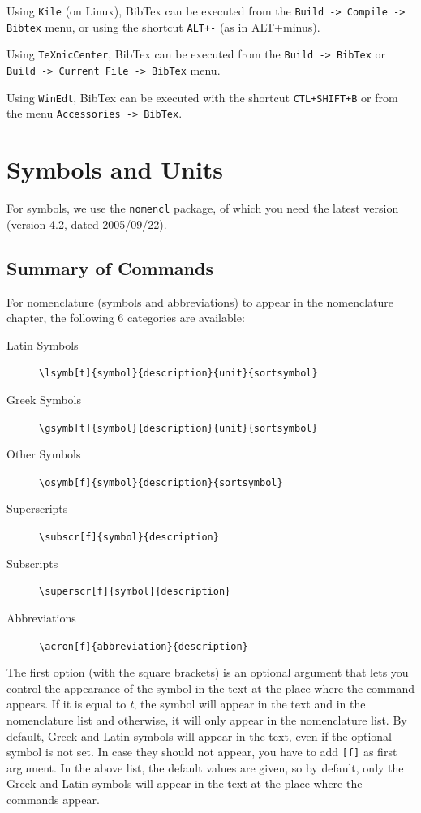         Using \verb+Kile+ (on Linux), BibTex can be executed from the \verb+Build -> Compile -> Bibtex+ menu, or using the shortcut \verb/ALT+-/ (as in ALT+minus).
        
        Using \verb+TeXnicCenter+, BibTex can be executed from the \verb+Build -> BibTex+ or \\
        \verb+Build -> Current File -> BibTex+ menu.
        
        Using \verb+WinEdt+, BibTex can be executed with the shortcut \verb/CTL+SHIFT+B/ or from the menu \verb/Accessories -> BibTex/.
    \section{Symbols and Units}%
        For symbols, we use the \verb+nomencl+ package, of which you need the latest version (version 4.2, dated 2005/09/22).
        \subsection{Summary of Commands}
            For nomenclature (symbols and abbreviations) to appear in the nomenclature chapter, the following 6 categories are available:
            
            \begin{description}
                \item[Latin Symbols]    \verb+\lsymb[t]{symbol}{description}{unit}{sortsymbol}+
                \item[Greek Symbols]    \verb+\gsymb[t]{symbol}{description}{unit}{sortsymbol}+
                \item[Other Symbols]    \verb+\osymb[f]{symbol}{description}{sortsymbol}+
                \item[Superscripts]     \verb+\subscr[f]{symbol}{description}+
                \item[Subscripts]       \verb+\superscr[f]{symbol}{description}+
                \item[Abbreviations]    \verb+\acron[f]{abbreviation}{description}+
            \end{description}
            The first option (with the square brackets) is an optional argument that lets you control the appearance of the symbol in the text at the place where the command appears. If it is equal to \emph{t}, the symbol will appear in the text and in the nomenclature list and otherwise, it will only appear in the nomenclature list. By default, Greek and Latin symbols will appear in the text, even if the optional symbol is not set. In case they should not appear, you have to add \verb|[f]| as first argument. In the above list, the default values are given, so by default, only the Greek and Latin symbols will appear in the text at the place where the commands appear.
            
